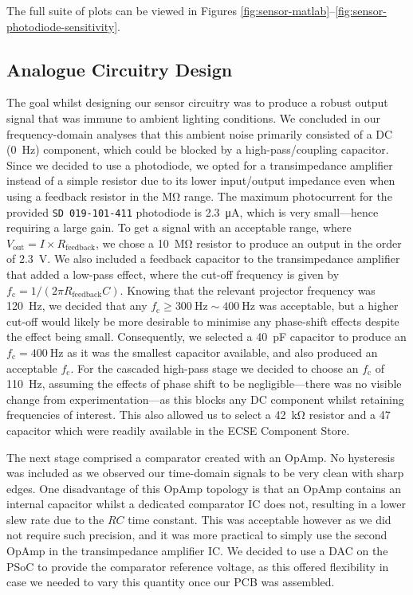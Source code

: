 \documentclass[conference]{IEEEtran}
\begin{document}
The full suite of plots can be viewed in Figures \ref{fig:sensor-matlab}–\ref{fig:sensor-photodiode-sensitivity}.

\subsection{Analogue Circuitry Design \label{subsect:analogue}}

The goal whilst designing our sensor circuitry was to produce a robust output signal that was immune to ambient lighting conditions.
We concluded in our frequency-domain analyses that this ambient noise primarily consisted of a DC (\qty{0}{\hertz}) component, which could be blocked by a high-pass/coupling capacitor.
Since we decided to use a photodiode, we opted for a transimpedance amplifier instead of a simple resistor due to its lower input/output impedance even when using a feedback resistor in the \unit{\Mohm} range.
The maximum photocurrent for the provided \texttt{SD 019-101-411} photodiode is \qty{2.3}{\uA}, which is very small—hence requiring a large gain.
To get a signal with an acceptable range, where $V_\text{out} = I \times R_\text{feedback}$, we chose a \qty{10}{\Mohm} resistor to produce an output in the order of \qty{2.3}{\volt}.
We also included a feedback capacitor to the transimpedance amplifier that added a low-pass effect, where the cut-off frequency is given by $f_\text{c} = 1 / (2\pi R_\text{feedback}C)$.
Knowing that the relevant projector frequency was \qty{120}{\hertz}, we decided that any $f_\text{c}\geq \qty{300}{\hertz}\sim \qty{400}{\hertz}$ was acceptable, but a higher cut-off would likely be more desirable to minimise any phase-shift effects despite the effect being small.
Consequently, we selected a \qty{40}{\pF} capacitor to produce an $f_\text{c}=\qty{400}{\hertz}$ as it was the smallest capacitor available, and also produced an acceptable $f_\text{c}$.
For the cascaded high-pass stage we decided to choose an $f_\text{c}$ of \qty{110}{\hertz}, assuming the effects of phase shift to be negligible—there was no visible change from experimentation—as this blocks any DC component whilst retaining frequencies of interest.
This also allowed us to select a \qty{42}{\kohm} resistor and a \qty{47}{\uF} capacitor which were readily available in the ECSE Component Store.

The next stage comprised a comparator created with an OpAmp.
No hysteresis was included as we observed our time-domain signals to be very clean with sharp edges.
One disadvantage of this OpAmp topology is that an OpAmp contains an internal capacitor whilst a dedicated comparator IC does not, resulting in a lower slew rate due to the $RC$ time constant.
This was acceptable however as we did not require such precision, and it was more practical to simply use the second OpAmp in the transimpedance amplifier IC.
We decided to use a DAC on the PSoC to provide the comparator reference voltage, as this offered flexibility in case we needed to vary this quantity once our PCB was assembled.
\end{document}
